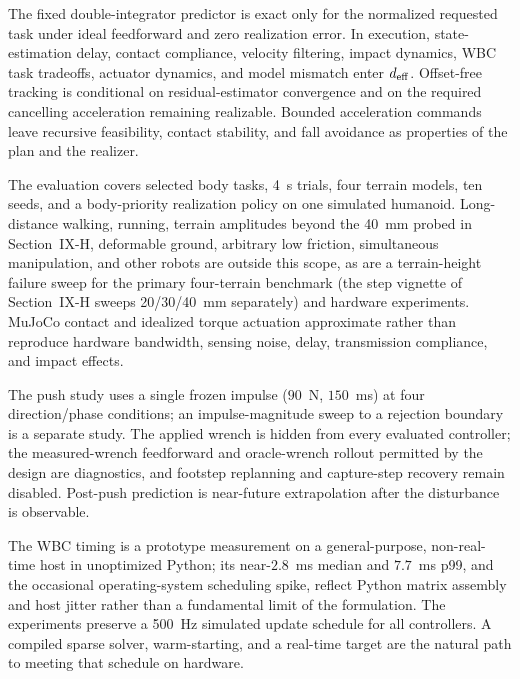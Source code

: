 \documentclass[journal]{IEEEtran}
\theoremstyle{plain}
\theoremstyle{definition}
\theoremstyle{remark}
\newcommand{\deff}{d_{\rm eff}}
\begin{document}
The fixed double-integrator predictor is exact only for the normalized requested task under ideal feedforward and zero realization error. In execution, state-estimation delay, contact compliance, velocity filtering, impact dynamics, WBC task tradeoffs, actuator dynamics, and model mismatch enter $\deff$. Offset-free tracking is conditional on residual-estimator convergence and on the required cancelling acceleration remaining realizable. Bounded acceleration commands leave recursive feasibility, contact stability, and fall avoidance as properties of the plan and the realizer.

The evaluation covers selected body tasks, 4~s trials, four terrain models, ten seeds, and a body-priority realization policy on one simulated humanoid. Long-distance walking, running, terrain amplitudes beyond the 40~mm probed in Section~IX-H, deformable ground, arbitrary low friction, simultaneous manipulation, and other robots are outside this scope, as are a terrain-height failure sweep for the primary four-terrain benchmark (the step vignette of Section~IX-H sweeps 20/30/40~mm separately) and hardware experiments. MuJoCo contact and idealized torque actuation approximate rather than reproduce hardware bandwidth, sensing noise, delay, transmission compliance, and impact effects.

The push study uses a single frozen impulse ($90$~N, $150$~ms) at four direction/phase conditions; an impulse-magnitude sweep to a rejection boundary is a separate study. The applied wrench is hidden from every evaluated controller; the measured-wrench feedforward and oracle-wrench rollout permitted by the design are diagnostics, and footstep replanning and capture-step recovery remain disabled. Post-push prediction is near-future extrapolation after the disturbance is observable.

The WBC timing is a prototype measurement on a general-purpose, non-real-time host in unoptimized Python; its near-$2.8$~ms median and $7.7$~ms p99, and the occasional operating-system scheduling spike, reflect Python matrix assembly and host jitter rather than a fundamental limit of the formulation. The experiments preserve a 500~Hz simulated update schedule for all controllers. A compiled sparse solver, warm-starting, and a real-time target are the natural path to meeting that schedule on hardware.
\end{document}
